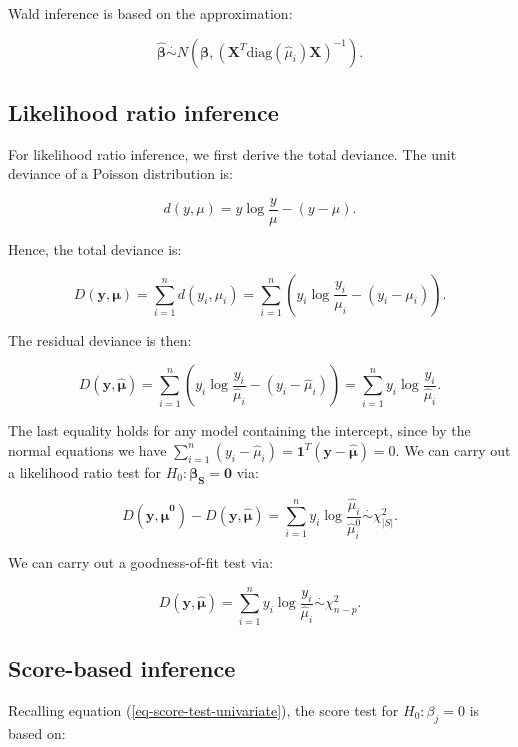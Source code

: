 \documentclass[
  11pt,
  letterpaper,
  oneside]{book}
\theoremstyle{definition}
\theoremstyle{plain}
\theoremstyle{plain}
\theoremstyle{plain}
\theoremstyle{remark}
\begin{document}
Wald inference is based on the approximation:

\[
\boldsymbol{\hat \beta} \overset \cdot \sim N(\boldsymbol{\beta}, (\boldsymbol{X}^T \text{diag}(\hat \mu_i)\boldsymbol{X})^{-1}).
\]

\hypertarget{sec-likelihood-ratio-inference}{%
\subsection{Likelihood ratio
inference}\label{sec-likelihood-ratio-inference}}

For likelihood ratio inference, we first derive the total deviance. The
unit deviance of a Poisson distribution is:

\[
d(y, \mu) = y \log \frac{y}{\mu} - (y - \mu).
\]

Hence, the total deviance is:

\[
D(\boldsymbol{y}, \boldsymbol{\mu}) = \sum_{i = 1}^n d(y_i, \mu_i) = \sum_{i = 1}^n \left(y_i \log \frac{y_i}{\mu_i} - (y_i - \mu_i)\right).
\]

The residual deviance is then:

\[
D(\boldsymbol{y}, \boldsymbol{\hat\mu}) = \sum_{i = 1}^n \left(y_i \log \frac{y_i}{\hat \mu_i} - (y_i - \hat \mu_i)\right) = \sum_{i = 1}^n y_i \log \frac{y_i}{\hat \mu_i}.
\]

The last equality holds for any model containing the intercept, since by
the normal equations we have
\(\sum_{i = 1}^n (y_i - \hat \mu_i) = \boldsymbol{1}^T (\boldsymbol{y} - \boldsymbol{\hat \mu}) = 0\).
We can carry out a likelihood ratio test for
\(H_0: \boldsymbol{\beta_S} = \boldsymbol{0}\) via:

\[
D(\boldsymbol{y}, \boldsymbol{\hat \mu^0}) - D(\boldsymbol{y}, \boldsymbol{\hat \mu}) = \sum_{i = 1}^n y_i \log \frac{\hat \mu_i}{\hat \mu^0_{i}} \overset{\cdot}\sim \chi^2_{|S|}.
\]

We can carry out a goodness-of-fit test via:

\[
D(\boldsymbol{y}, \boldsymbol{\hat\mu}) = \sum_{i = 1}^n y_i \log \frac{y_i}{\hat \mu_i} \overset{\cdot}\sim \chi^2_{n - p}.
\]

\hypertarget{sec-score-based-inference}{%
\subsection{Score-based inference}\label{sec-score-based-inference}}

Recalling equation (\ref{eq-score-test-univariate}), the score test for
\(H_0: \beta_j = 0\) is based on:
\end{document}
